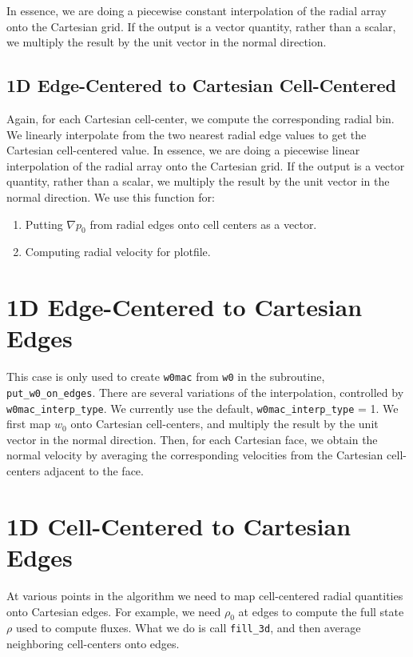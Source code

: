 In essence, we are doing a piecewise constant interpolation of the radial array 
onto the Cartesian grid.  If the output is a vector quantity, rather than a 
scalar, we multiply the result by the unit vector in the normal direction.
\subsection{1D Edge-Centered to Cartesian Cell-Centered}
\label{Sec:1D Edge-Centered to Cartesian Cell-Centered}
Again, for each Cartesian cell-center, we compute the corresponding radial
bin.  We linearly interpolate from the two nearest radial edge values 
to get the Cartesian cell-centered value.  In essence,
we are doing a piecewise linear interpolation of the radial array onto the 
Cartesian grid.  If the output is a vector quantity, rather than a scalar, we
multiply the result by the unit vector in the normal direction.
We use this function for:
\begin{enumerate}
\item Putting $\nabla p_0$ from radial edges onto cell centers as a vector.
\item Computing radial velocity for plotfile.
\end{enumerate}
\section{1D Edge-Centered to Cartesian Edges}
\label{Sec:1D Edge-Centered to Cartesian Edges}
This case is only used to create {\tt w0mac} from {\tt w0} in the 
subroutine, {\tt put\_w0\_on\_edges}.  There are several variations 
of the interpolation, controlled by {\tt w0mac\_interp\_type}.  We 
currently use the default, {\tt w0mac\_interp\_type} = 1.  We first 
map $w_0$ onto Cartesian cell-centers, and multiply the result by 
the unit vector in the normal direction.  Then, for each Cartesian 
face, we obtain the normal velocity by averaging the corresponding 
velocities from the Cartesian cell-centers adjacent to the face.
\section{1D Cell-Centered to Cartesian Edges}
At various points in the algorithm we need to map cell-centered radial 
quantities onto Cartesian edges.  For example, we need $\rho_0$ at edges 
to compute the full state $\rho$ used to compute fluxes.  What we do
is call {\tt fill\_3d}, and then average neighboring cell-centers onto
edges.
